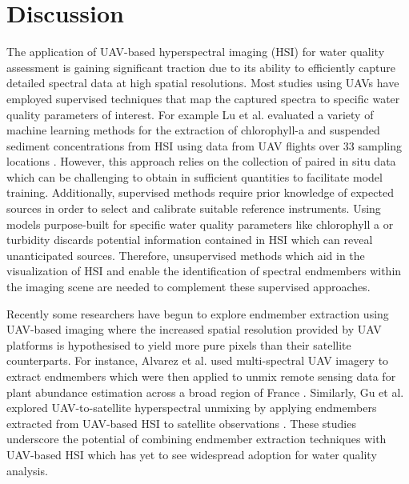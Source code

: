 \documentclass[remotesensing,article,submit,pdftex,moreauthors]{Definitions/mdpi}
\begin{document}
\section{Discussion}\label{discussion}


The application of UAV-based hyperspectral imaging (HSI) for water quality assessment is gaining significant traction due to its ability to efficiently capture detailed spectral data at high spatial resolutions. Most studies using UAVs have employed supervised techniques that map the captured spectra to specific water quality parameters of interest. For example Lu et al. evaluated a variety of machine learning methods for the extraction of chlorophyll-a and suspended sediment concentrations from HSI using data from UAV flights over 33 sampling locations \cite{lu2021retrieval}. However, this approach relies on the collection of paired in situ data which can be challenging to obtain in sufficient quantities to facilitate model training. Additionally, supervised methods require prior knowledge of expected sources in order to select and calibrate suitable reference instruments. Using models purpose-built for specific water quality parameters like chlorophyll a or turbidity discards potential information contained in HSI which can reveal unanticipated sources. Therefore, unsupervised methods which aid in the visualization of HSI and enable the identification of spectral endmembers within the imaging scene are needed to complement these supervised approaches.

Recently some researchers have begun to explore endmember extraction using UAV-based imaging where the increased spatial resolution provided by UAV platforms is hypothesised to yield more pure pixels than their satellite counterparts. For instance, Alvarez et al. used multi-spectral UAV imagery to extract endmembers which were then applied to unmix remote sensing data for plant abundance estimation across a broad region of France \cite{alvarez2020can}. Similarly, Gu et al. explored UAV-to-satellite hyperspectral unmixing by applying endmembers extracted from UAV-based HSI to satellite observations \cite{gu2023intrinsic}. These studies underscore the potential of combining endmember extraction techniques with UAV-based HSI which has yet to see widespread adoption for water quality analysis.
\end{document}
